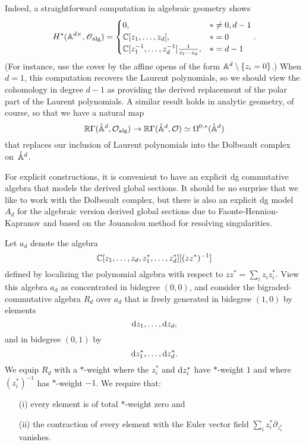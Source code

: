 Indeed, a straightforward computation in algebraic geometry shows
\[
H^*(\AA^{d\times}, \sO_{\rm alg}) = 
\begin{cases} 
0, & * \neq 0, d-1 \\ 
\CC[z_1,\ldots,z_d], & * = 0 \\ \CC[z_1^{-1},\ldots,z_d^{-1}] \frac{1}{z_1 \cdots z_d}, & * = d-1 
\end{cases}.
\]
(For instance, use the cover by the affine opens of the form $\AA^d \setminus \{z_i =0\}$.)
When $d=1$, this computation recovers the Laurent polynomials,
so we should view the cohomology in degree $d-1$ as providing the derived replacement of the polar part of the Laurent polynomials.
A similar result holds in analytic geometry, of course,
so that we have a natural map
\[
\RR \Gamma(\pAA^d, \cO_{\rm alg}) \to \RR \Gamma(\pAA^d, \cO) \simeq \Omega^{0,*}(\pAA^d)
\]
that replaces our inclusion of Laurent polynomials into the Dolbeault complex on~$\pAA^d$.

For explicit constructions, it is convenient to have an explicit dg commutative algebra that models the derived global sections.
It should be no surprise that we like to work with the Dolbeault complex,
but there is also an explicit dg model $A_d$ for the algebraic version derived global sections due to Faonte-Hennion-Kapranov \cite{FHK} and based on the Jouanolou method for resolving singularities. 

\begin{dfn}
Let $a_d$ denote the algebra  
\[
\CC[z_1,\ldots,z_d, z_1^*,\ldots,z_d^*][(z z^*)^{-1}]
\]
defined by localizing the polynomial algebra with respect to $zz^* = \sum_i z_i z^*_i$.
View this algebra $a_d$ as concentrated in bidegree $(0,0)$, 
and consider the bigraded-commutative algebra $R_d$ over $a_d$ that is freely generated in bidegree $(1,0)$ by elements
\[
\d z_1,\ldots , \d z_d,
\] 
and in bidegree $(0,1)$ by
\[
\d z_1^*,\ldots, \d z_d^*.
\]
We equip $R_d$ with a $*$-weight where the $z_i^*$ and $\d z_i^*$ have $*$-weight $1$ and where $(z_i^*)^{-1}$ has $*$-weight $-1$.
We require that:
\begin{itemize}
\item[(i)] every element is of total $*$-weight zero and
\item[(ii)] the contraction of every element with the Euler vector field $\sum_{i} z_i^* \partial_{z_{i}^*}$ vanishes.
\end{itemize}
\end{dfn}

